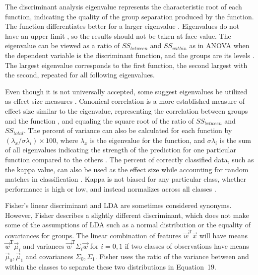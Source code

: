 \documentclass[preprint,12pt]{elsarticle}
\begin{document}
The discriminant analysis eigenvalue represents the characteristic root of each function, indicating the quality of the group separation produced by the function. The function differentiates better for a larger eigenvalue \cite{cokluk2008discriminant}. Eigenvalues do not have an upper limit \cite{cokluk2008discriminant, hansen2005using}, so the results should not be taken at face value. The eigenvalue can be viewed as a ratio of $SS_{between}$ and $SS_{within}$ as in ANOVA when the dependent variable is the discriminant function, and the groups are its levels \cite{cokluk2008discriminant}. The largest eigenvalue corresponds to the first function, the second largest with the second, repeated for all following eigenvalues.

Even though it is not universally accepted, some suggest eigenvalues be utilized as effect size measures \cite{hansen2005using}. Canonical correlation is a more established measure of effect size similar to the eigenvalue, representing the correlation between groups and the function \cite{hansen2005using}, and equaling the square root of the ratio of $SS_{between}$ and $SS_{total}$. The percent of variance can also be calculated for each function by $(\lambda_{x}/\sigma\lambda_{i}) \times 100$, where $\lambda_{x}$ is the eigenvalue for the function, and $\sigma\lambda_{i}$ is the sum of all eigenvalues indicating the strength of the prediction for one particular function compared to the others \cite{hansen2005using}. The percent of correctly classified data, such as the kappa value, can also be used as the effect size while accounting for random matches in classification \cite{hansen2005using}. Kappa is not biased for any particular class, whether performance is high or low, and instead normalizes across all classes \cite{israel2006performance}. 

Fisher's linear discriminant and LDA are sometimes considered synonyms. However, Fisher \cite{fisher1936use} describes a slightly different discriminant, which does not make some of the assumptions of LDA such as a normal distribution or the equality of covariances for groups. The linear combination of features ${\vec{w}}^{\mathrm{T}}{\vec{x}}$ will have means ${\vec{w}}^{\mathrm{T}}{\vec{\mu}}_{i}$ and variances ${\vec{w}}^{\mathrm{T}}\Sigma_{i}{\vec{w}}$ for $i=0,1$ if two classes of observations have means ${\vec{\mu}}_{0},{\vec{\mu}}_{1}$ and covariances $\Sigma_{0},\Sigma_{1}$. Fisher uses the ratio of the variance between and within the classes to separate these two distributions in Equation~19.
\end{document}
